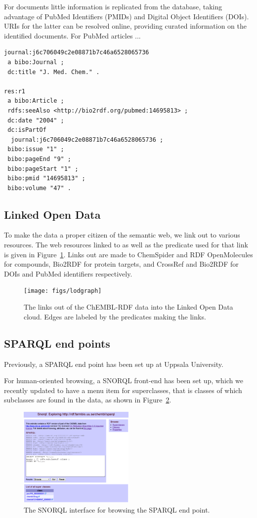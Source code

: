 \documentclass[sw]{iosart2c}
\begin{document}
For documents little information is replicated from the database, taking advantage
of PubMed Identifiers (PMIDs) and Digital Object Identifiers (DOIs). URIs for the
latter can be resolved online, providing curated information on the identified
documents. For PubMed articles ...

\begin{tiny}
\begin{verbatim}
journal:j6c706049c2e08871b7c46a6528065736
 a bibo:Journal ;
 dc:title "J. Med. Chem." .

res:r1
 a bibo:Article ;
 rdfs:seeAlso <http://bio2rdf.org/pubmed:14695813> ;
 dc:date "2004" ;
 dc:isPartOf
  journal:j6c706049c2e08871b7c46a6528065736 ;
 bibo:issue "1" ;
 bibo:pageEnd "9" ;
 bibo:pageStart "1" ;
 bibo:pmid "14695813" ;
 bibo:volume "47" .
\end{verbatim}
\end{tiny}

\subsection{Linked Open Data}

To make the data a proper citizen of the semantic web, we link out to various resources.
The web resources linked to as well as the predicate used for that link is given in
Figure~\ref{2}.
Links out are made to ChemSpider and RDF OpenMolecules for compounds, Bio2RDF for
protein targets, and CrossRef and Bio2RDF for DOIs and PubMed identifiers respectively.

\begin{figure}[t]
\texttt{[image: figs/lodgraph]}
\caption{The links out of the ChEMBL-RDF data into the Linked Open Data cloud.
Edges are labeled by the predicates making the links.}\label{2}
\end{figure}

\subsection{SPARQL end points}

Previously, a SPARQL end point has been set up at Uppsala University.

For human-oriented browsing, a SNORQL front-end has been set up, which we
recently updated to have a menu item for superclasses, that is classes
of which subclasses are found in the data, as shown in Figure~\ref{f2}.

\begin{figure}[bt]
\includegraphics[width=0.5\textwidth]{snorql}
\caption{The SNORQL interface for browsing the SPARQL end point.}\label{f2}
\end{figure}
\end{document}
